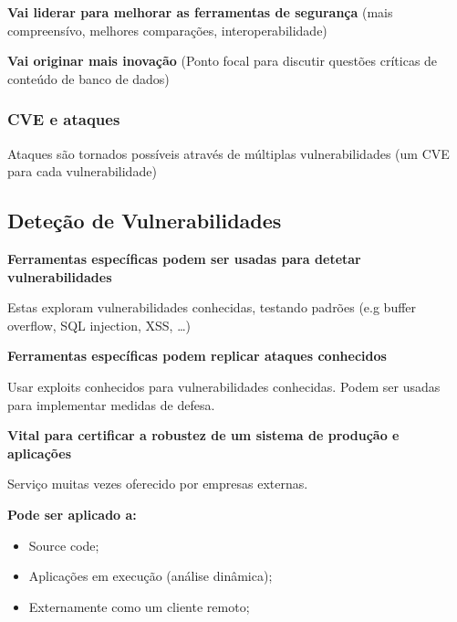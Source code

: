 \documentclass{article}
\begin{document}
  \vspace{2mm}

  \textbf{Vai liderar para melhorar as ferramentas de segurança} (mais compreensívo,
  melhores comparações, interoperabilidade)

  \vspace{2mm}

  \textbf{Vai originar mais inovação} (Ponto focal para discutir questões críticas de conteúdo de banco de dados)

  \subsubsection{CVE e ataques}

  Ataques são tornados possíveis através de múltiplas vulnerabilidades (um CVE para cada vulnerabilidade)

  

  \subsection{Deteção de Vulnerabilidades}

  \textbf{Ferramentas específicas podem ser usadas para detetar vulnerabilidades}

  Estas exploram vulnerabilidades conhecidas, testando padrões (e.g buffer overflow, SQL injection, XSS, \dots)

  \vspace{2mm}

  \textbf{Ferramentas específicas podem replicar ataques conhecidos}

  Usar exploits conhecidos para vulnerabilidades conhecidas. Podem ser usadas
  para implementar medidas de defesa.

  \vspace{2mm}
  
  \textbf{Vital para certificar a robustez de um sistema de produção e aplicações}

  Serviço muitas vezes oferecido por empresas externas.

  \vspace{2mm}

  \textbf{Pode ser aplicado a:}
  \begin{itemize}
    \item Source code;
    \item Aplicações em execução (análise dinâmica);
    \item Externamente como um cliente remoto;
  \end{itemize}
\end{document}

